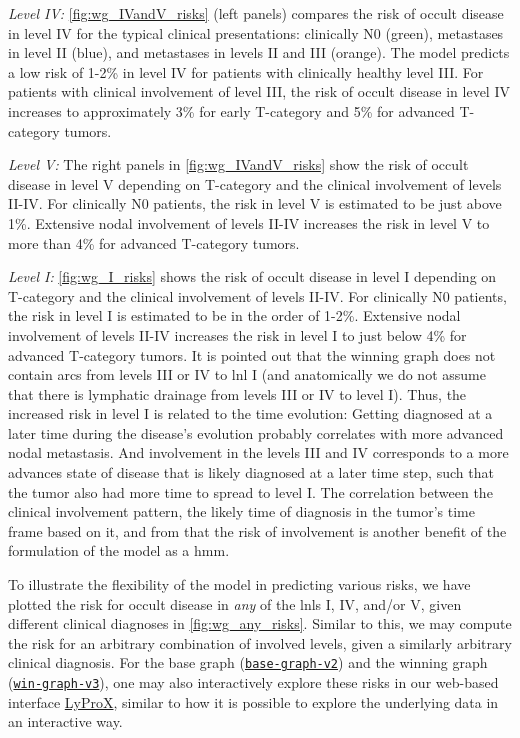 \documentclass[twocolumn]{article}
\begin{document}
{\it Level IV:} \cref{fig:wg_IVandV_risks} (left panels) compares the risk of occult disease in level IV for the typical clinical presentations: clinically N0 (green), metastases in level II (blue), and metastases in levels II and III (orange). The model predicts a low risk of 1-2\% in level IV for patients with clinically healthy level III. For patients with clinical involvement of level III, the risk of occult disease in level IV increases to approximately 3\% for early T-category and 5\% for advanced T-category tumors.

{\it Level V:} The right panels in \cref{fig:wg_IVandV_risks} show the risk of occult disease in level V depending on T-category and the clinical involvement of levels II-IV. For clinically N0 patients, the risk in level V is estimated to be just above 1\%. Extensive nodal involvement of levels II-IV increases the risk in level V to more than 4\% for advanced T-category tumors. 

{\it Level I:} \cref{fig:wg_I_risks} shows the risk of occult disease in level I depending on T-category and the clinical involvement of levels II-IV. For clinically N0 patients, the risk in level I is estimated to be in the order of 1-2\%. Extensive nodal involvement of levels II-IV increases the risk in level I to just below 4\% for advanced T-category tumors. It is pointed out that the winning graph does not contain arcs from levels III or IV to \gls{lnl} I (and anatomically we do not assume that there is lymphatic drainage from levels III or IV to level I). Thus, the increased risk in level I is related to the time evolution: Getting diagnosed at a later time during the disease's evolution probably correlates with more advanced nodal metastasis. And involvement in the levels III and IV corresponds to a more advances state of disease that is likely diagnosed at a later time step, such that the tumor also had more time to spread to level I. The correlation between the clinical involvement pattern, the likely time of diagnosis in the tumor's time frame based on it, and from that the risk of involvement is another benefit of the formulation of the model as a \gls{hmm}.

To illustrate the flexibility of the model in predicting various risks, we have plotted the risk for occult disease in \textit{any} of the \glspl{lnl} I, IV, and/or V, given different clinical diagnoses in \cref{fig:wg_any_risks}. Similar to this, we may compute the risk for an arbitrary combination of involved levels, given a similarly arbitrary clinical diagnosis. For the base graph (\href{https://lyprox.org/riskpredictor/9}{\texttt{base-graph-v2}}) and the winning graph (\href{https://lyprox.org/riskpredictor/8}{\texttt{win-graph-v3}}), one may also interactively explore these risks in our web-based interface \href{https://lyprox.org/riskpredictor/list}{LyProX}, similar to how it is possible to explore the underlying data in an interactive way.
\end{document}
